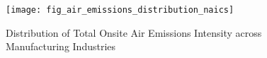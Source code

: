 \begin{figure}[H]
    \centering
    \texttt{[image: fig\_air\_emissions\_distribution\_naics]}
    \caption{Distribution of Total Onsite Air Emissions Intensity across Manufacturing Industries}
    \label{fig:air-emissions-distribution-naics}
\end{figure}